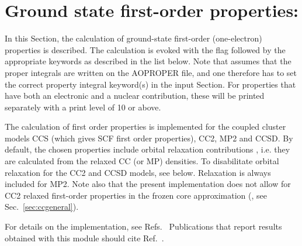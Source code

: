 \section{Ground state first-order properties: }
\label{sec:ccfop}

In this Section, the calculation of ground-state first-order
(one-electron) properties is described. The calculation
is evoked with the  flag followed by the appropriate
keywords as described in the list below. Note that 
assumes that the proper integrals are written on the
AOPROPER file, and one therefore has to set the correct property
integral keyword(s) in the  input Section. For properties
that have both an electronic and a nuclear contribution, these will
be printed separately with a print level of 10 or above.

The calculation of first order properties is implemented for the 
coupled cluster models CCS (which gives SCF first order properties),
CC2, MP2 and CCSD.  
By default, the chosen properties include orbital relaxation
contributions ,
i.e. they are calculated from the relaxed CC (or MP) densities. 
To disabilitate orbital relaxation for the CC2 and CCSD models, 
see  below. Relaxation is always included for MP2. 
Note also that the present implementation does not allow for 
CC2 relaxed first-order
properties in the frozen core approximation 
(, see Sec.~\ref{sec:ccgeneral}).

For details on the implementation, see 
Refs.~\cite{Halkier:CCFOP,Halkier:CC2RLXFOP}
Publications that report results obtained with this module
should cite Ref.\ \cite{Halkier:CCFOP}.

